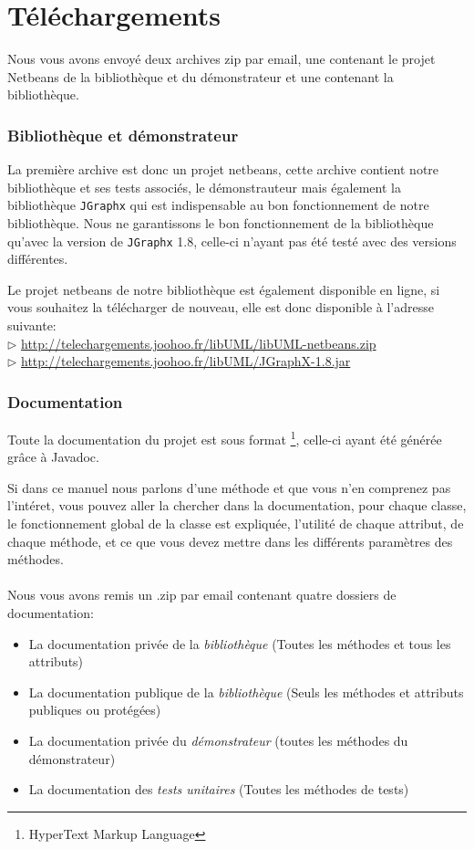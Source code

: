 	\section*{Téléchargements}
	Nous vous avons envoyé deux archives zip par email, une contenant le projet Netbeans de la bibliothèque et du démonstrateur et une contenant la bibliothèque.
	\subsubsection*{Bibliothèque et démonstrateur}
	La première archive est donc un projet netbeans, cette archive contient notre bibliothèque et ses tests associés, le démonstrauteur mais
	également la bibliothèque \texttt{JGraphx} qui est indispensable au bon fonctionnement de notre bibliothèque. Nous ne garantissons le bon fonctionnement 
	de la bibliothèque qu'avec la version de \texttt{JGraphx} 1.8, celle-ci n'ayant pas été testé avec des versions différentes.

	Le projet netbeans de notre bibliothèque est également disponible en ligne, si vous souhaitez la télécharger de nouveau, elle est donc disponible à l'adresse suivante: \\
	$\rhd$ \url{http://telechargements.joohoo.fr/libUML/libUML-netbeans.zip}\\
	$\rhd$ \url{http://telechargements.joohoo.fr/libUML/JGraphX-1.8.jar}\\
	
	\subsubsection*{Documentation}
	Toute la documentation du projet est sous format \footnote{HyperText Markup Language}, celle-ci ayant été générée grâce à Javadoc.

	Si dans ce manuel nous parlons d'une méthode et que vous n'en comprenez pas l'intéret, vous pouvez aller la chercher dans la documentation, pour chaque classe,
	le fonctionnement global de la classe est expliquée, l'utilité de chaque attribut, de chaque méthode, et ce que vous devez mettre dans les différents paramètres 
	des méthodes.  
	\paragraph{}
	Nous vous avons remis un .zip par email contenant quatre dossiers de documentation:
	\begin{itemize}
		\item La documentation privée de la \textit{bibliothèque} (Toutes les méthodes et tous les attributs)
		\item La documentation publique de la \textit{bibliothèque} (Seuls les méthodes et attributs publiques ou protégées)
		\item La documentation privée du \textit{démonstrateur} (toutes les méthodes du démonstrateur) 
		\item La documentation des \textit{tests unitaires} (Toutes les méthodes de tests)
	\end{itemize}
